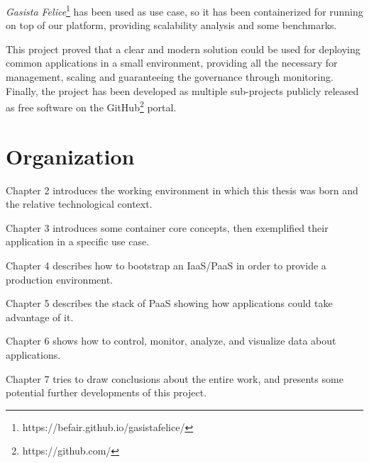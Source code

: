 \textit{Gasista Felice}\footnote{https://befair.github.io/gasistafelice/} has been used as use case, so it has been containerized for running on top of our platform, providing scalability analysis and some benchmarks.

This project proved that a clear and modern solution could be used for deploying common applications in a small environment, providing all the necessary for management, scaling and guaranteeing the governance through monitoring.  Finally, the project has been developed as multiple sub-projects publicly released as free software on the GitHub\footnote{https://github.com/} portal.

\section{Organization}\label{organization}

Chapter 2 introduces the working environment in which this thesis was born and the relative technological context.

Chapter 3 introduces some container core concepts, then exemplified their application in a specific use case.

Chapter 4 describes how to bootstrap an IaaS/PaaS in order to provide a production environment.

Chapter 5 describes the stack of PaaS showing how applications could take advantage of it.

Chapter 6 shows how to control, monitor, analyze, and visualize data
about applications.

Chapter 7 tries to draw conclusions about the entire work, and presents some potential further developments of this project.